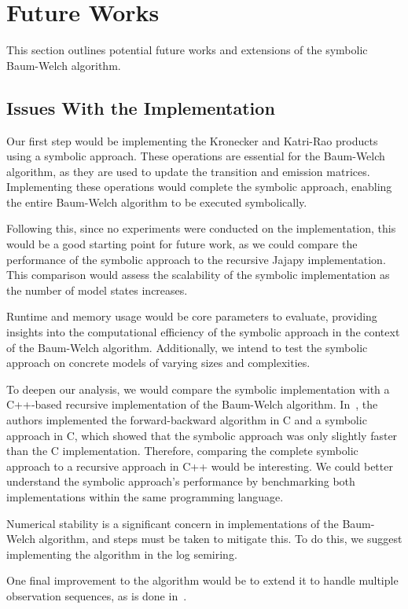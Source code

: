 \section{Future Works}\label{sec:future_works}
This section outlines potential future works and extensions of the symbolic Baum-Welch algorithm.

\subsection{Issues With the Implementation}
Our first step would be implementing the Kronecker and Katri-Rao products using a symbolic approach. 
These operations are essential for the Baum-Welch algorithm, as they are used to update the transition and emission matrices.
Implementing these operations would complete the symbolic approach, enabling the entire Baum-Welch algorithm to be executed symbolically.

Following this, since no experiments were conducted on the implementation, this would be a good starting point for future work, as we could compare the performance of the symbolic approach to the recursive Jajapy implementation.
This comparison would assess the scalability of the symbolic implementation as the number of model states increases. 

Runtime and memory usage would be core parameters to evaluate, providing insights into the computational efficiency of the symbolic approach in the context of the Baum-Welch algorithm.
Additionally, we intend to test the symbolic approach on concrete models of varying sizes and complexities. 

To deepen our analysis, we would compare the symbolic implementation with a C++-based recursive implementation of the Baum-Welch algorithm. 
In~\cite{p7}, the authors implemented the forward-backward algorithm in C and a symbolic approach in C, which showed that the symbolic approach was only slightly faster than the C implementation.
Therefore, comparing the complete symbolic approach to a recursive approach in C++ would be interesting.
We could better understand the symbolic approach's performance by benchmarking both implementations within the same programming language.

Numerical stability is a significant concern in implementations of the Baum-Welch algorithm, and steps must be taken to mitigate this.
To do this, we suggest implementing the algorithm in the log semiring.

One final improvement to the algorithm would be to extend it to handle multiple observation sequences, as is done in~\cite{reynouard2023jajapy}.

